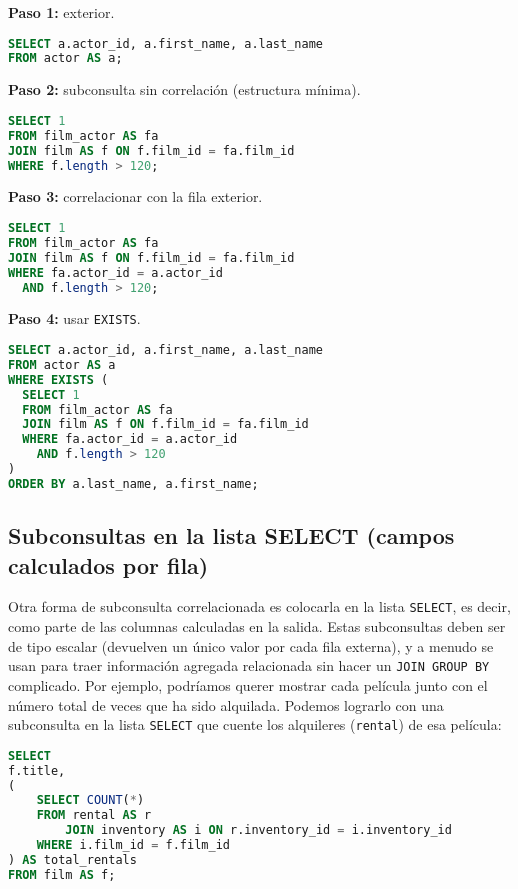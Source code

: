 \documentclass[12pt,a4paper]{article}
\begin{document}
\textbf{Paso 1:} exterior.
\begin{lstlisting}[language=SQL]
SELECT a.actor_id, a.first_name, a.last_name
FROM actor AS a;
\end{lstlisting}

\textbf{Paso 2:} subconsulta sin correlación (estructura mínima).
\begin{lstlisting}[language=SQL]
SELECT 1
FROM film_actor AS fa
JOIN film AS f ON f.film_id = fa.film_id
WHERE f.length > 120;
\end{lstlisting}

\textbf{Paso 3:} correlacionar con la fila exterior.
\begin{lstlisting}[language=SQL]
SELECT 1
FROM film_actor AS fa
JOIN film AS f ON f.film_id = fa.film_id
WHERE fa.actor_id = a.actor_id
  AND f.length > 120;
\end{lstlisting}

\textbf{Paso 4:} usar \texttt{EXISTS}.
\begin{lstlisting}[language=SQL]
SELECT a.actor_id, a.first_name, a.last_name
FROM actor AS a
WHERE EXISTS (
  SELECT 1
  FROM film_actor AS fa
  JOIN film AS f ON f.film_id = fa.film_id
  WHERE fa.actor_id = a.actor_id
    AND f.length > 120
)
ORDER BY a.last_name, a.first_name;
\end{lstlisting}


\subsection*{Subconsultas en la lista SELECT (campos calculados por fila)} Otra forma de subconsulta correlacionada es colocarla en la lista \texttt{SELECT}, es decir, como parte de las columnas calculadas en la salida.
%
Estas subconsultas deben ser de tipo escalar (devuelven un único valor por cada fila externa), y a menudo se usan para traer información agregada relacionada sin hacer un \texttt{JOIN GROUP BY} complicado.
%
Por ejemplo, podríamos querer mostrar cada película junto con el número total de veces que ha sido alquilada.
%
Podemos lograrlo con una subconsulta en la lista \texttt{SELECT} que cuente los alquileres (\texttt{rental}) de esa película: 


\begin{lstlisting}[language=SQL]
SELECT
f.title,
(
	SELECT COUNT(*)
	FROM rental AS r
		JOIN inventory AS i ON r.inventory_id = i.inventory_id
	WHERE i.film_id = f.film_id
) AS total_rentals
FROM film AS f;
\end{lstlisting}
\end{document}
